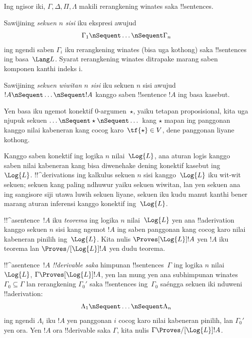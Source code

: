 \documentclass[../../../include/open-logic-section]{subfiles}
\begin{document}


Ing ngisor iki, $\Gamma, \Delta, \Pi, \Lambda$ makili
rerangkening winates saka !!{sentence}s.

\begin{defn}[Sekuen]
Sawijining \emph{sekuen $n$ sisi} iku ekspresi awujud
\[
\Gamma_1 \nSequent \dots \nSequent \Gamma_n
\]
ing ngendi saben $\Gamma_i$ iku rerangkening winates
(bisa uga kothong) saka !!{sentence}s ing basa~$\Lang L$.
Syarat rerangkening winates ditrapake marang saben komponen kanthi indeks i.
\end{defn}

\begin{defn}
Sawijining \emph{sekuen wiwitan $n$ sisi} iku sekuen $n$ sisi
awujud $!A \nSequent \dots \nSequent !A$ kanggo saben
!!{sentence} $!A$ ing basa kasebut.

Yen basa iku ngemot konektif $0$-argumen~$\star$,
yaiku tetapan proposisional, kita uga njupuk sekuen
$\dots \nSequent \star \nSequent \dots$ kang $\star$ mapan
ing panggonan kanggo nilai kabeneran kang cocog karo~$\tf{\star}
\in V$, dene panggonan liyane kothong.
\end{defn}

Kanggo saben konektif ing logika $n$ nilai~$\Log{L}$,
ana aturan logis kanggo saben nilai kabeneran kang bisa
diwenehake dening konektif kasebut ing~$\Log{L}$.
!!^{derivation}s ing kalkulus sekuen $n$ sisi kanggo~$\Log{L}$
iku wit-wit sekuen; sekuen kang paling ndhuwur yaiku sekuen
wiwitan, lan yen sekuen ana ing sangisore siji utawa luwih
sekuen liyane, sekuen iku kudu manut kanthi bener marang
aturan inferensi kanggo konektif ing~$\Log{L}$.

\begin{defn}[Teorema]
!!^a{sentence}~$!A$ iku \emph{teorema} ing logika $n$ nilai~$\Log{L}$
yen ana !!a{derivation} kanggo sekuen $n$ sisi kang ngemot $!A$
ing saben panggonan kang cocog karo nilai kabeneran pinilih
ing~$\Log{L}$. Kita nulis $\Proves[\Log{L}] !A$ yen $!A$
iku teorema lan $\Proves/[\Log{L}] !A$ yen dudu teorema.
\end{defn}

\begin{defn}[!!^{derivability}]
!!^a{sentence}~$!A$ \emph{!!{derivable} saka} himpunan
!!{sentence}s~$\Gamma$ ing logika $n$ nilai~$\Log{L}$,
$\Gamma \Proves[\Log{L}] !A$, yen lan mung yen ana subhimpunan
winates~$\Gamma_0 \subseteq \Gamma$ lan rerangkening $\Gamma_0'$
saka !!{sentence}s ing~$\Gamma_0$ saéngga sekuen iki
nduweni !!a{derivation}:
\[ \Lambda_1 \nSequent \dots \nSequent \Lambda_n \]
ing ngendi $\Lambda_i$ iku $!A$ yen panggonan $i$ cocog karo
nilai kabeneran pinilih, lan $\Gamma_0'$ yen ora. Yen $!A$
ora !!{derivable} saka $\Gamma$, kita nulis
$\Gamma \Proves/[\Log{L}] !A$.
\end{defn}
\end{document}
